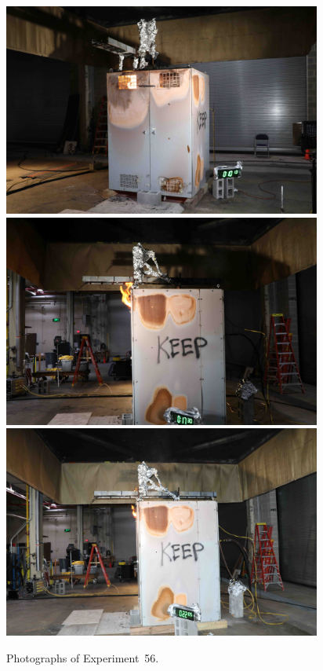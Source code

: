 \begin{figure}[p]
\centering
\includegraphics[height=2.75in]{../FIGURES/Test_56_10_min_13_s} \\
\includegraphics[height=2.75in]{../FIGURES/Test_56_17_min_30_s} \\
\includegraphics[height=2.75in]{../FIGURES/Test_56_22_min_5_s}
\caption[Photographs of Experiment~56]{Photographs of Experiment~56.}
\label{fig:Test_56_photos}
\end{figure}


\clearpage

